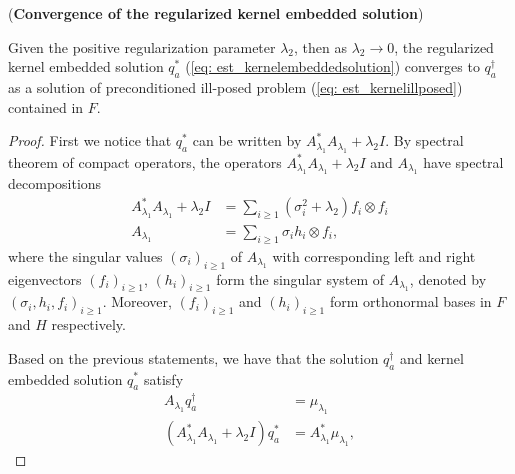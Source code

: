 \begin{theorem}(\textbf{Convergence of the regularized kernel embedded solution})
    
    \label{thm: est_kernelembeddedtotrue}
    Given the positive regularization parameter $\lambda_2$, then as $\lambda_2\rightarrow 0$, 
    the regularized kernel embedded solution $q_a^*$ (\ref{eq: est_kernelembeddedsolution}) converges to $q_a^{\dagger}$
    as a solution of preconditioned ill-posed problem (\ref{eq: est_kernelillposed}) contained in $F$. 
\end{theorem}
\begin{proof}
    First we notice that $q_a^*$ can be written by $A_{\lambda_1}^*A_{\lambda_1}+\lambda_2I$. 
    By spectral theorem of compact operators\cite{Neervan2022functional}, 
    the operators $A_{\lambda_1}^*A_{\lambda_1}+\lambda_2I$ and $A_{\lambda_1}$ have spectral decompositions 
    \begin{align}
        A_{\lambda_1}^*A_{\lambda_1}+\lambda_2I &= \sum_{i\geq 1}(\sigma_i^2+\lambda_2)f_i\otimes f_i \label{eq: est_spectralAA} \\
        A_{\lambda_1} &= \sum_{i\geq 1}\sigma_i h_i\otimes f_i, \label{eq: est_spectralA}
    \end{align}
    where the singular values $(\sigma_i)_{i\geq 1}$ of $A_{\lambda_1}$ with corresponding left and right eigenvectors $(f_i)_{i\geq 1}$, $(h_i)_{i\geq 1}$ 
    form the singular system of $A_{\lambda_1}$, denoted by $(\sigma_i,h_i,f_i)_{i\geq 1}$. 
    Moreover, $(f_i)_{i\geq 1}$ and $(h_i)_{i\geq 1}$ form orthonormal bases in $F$ and $H$ respectively. 

    Based on the previous statements, we have that the solution $q_a^{\dagger}$ and kernel embedded solution $q_a^*$ satisfy 
    \begin{align}
        A_{\lambda_1}q_a^{\dagger} &= \mu_{\lambda_1} \label{eq: est_truesolutioneq} \\
        (A_{\lambda_1}^*A_{\lambda_1}+\lambda_2I)q_a^* &= A_{\lambda_1}^*\mu_{\lambda_1}, \label{eq: est_kernelsolutioneq}
    \end{align}
    

\end{proof}
